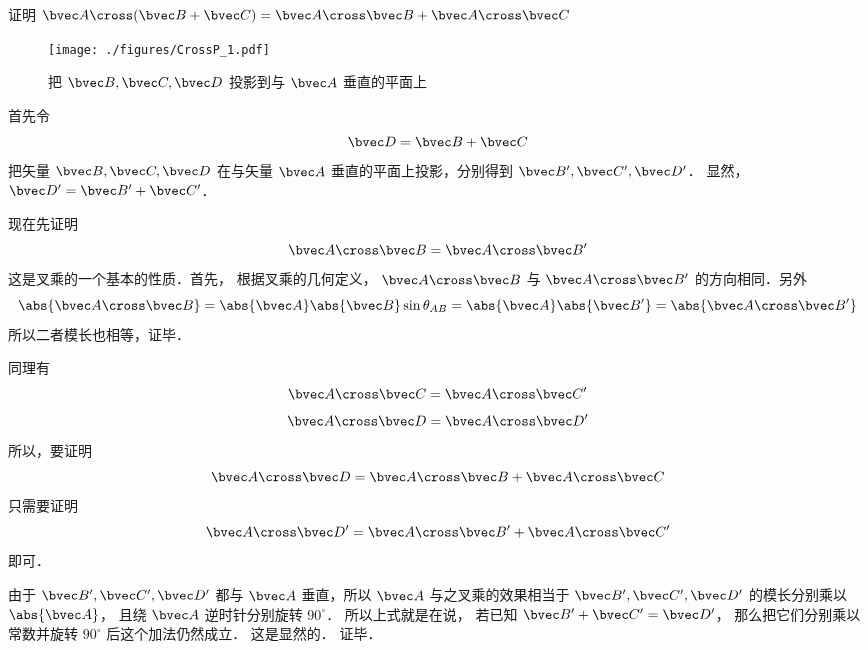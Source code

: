 
证明 $\bvec A \cross (\bvec B + \bvec C) = \bvec A \cross \bvec B + \bvec A \cross \bvec C$ 

\begin{figure}[ht]
\vskip-10pt
\centering
\texttt{[image: ./figures/CrossP\_1.pdf]}
\caption{把 $\bvec B,\bvec C,\bvec D$ 投影到与 $\bvec A$ 垂直的平面上}
\end{figure}

首先令
\begin{equation}
\bvec D = \bvec B + \bvec C
\end{equation}
把矢量 $\bvec B,\bvec C,\bvec D$ 在与矢量 $\bvec A$ 垂直的平面上投影，分别得到 $\bvec B',\bvec C',\bvec D'$． 显然，$\bvec D'=\bvec B'+\bvec C'$． 

现在先证明
\begin{equation}
\bvec A \cross \bvec B = \bvec A \cross \bvec B'
\end{equation} 
这是叉乘的一个基本的性质．首先，
根据叉乘的几何定义， $\bvec A \cross \bvec B$ 与
 $\bvec A \cross \bvec B'$ 的方向相同．另外
\begin{equation}\label{CrossP_eq1}
\abs{\bvec A \cross \bvec B}  = \abs{\bvec A} \abs{\bvec B} \sin{\theta_{AB}} = \abs{\bvec A} \abs{\bvec B'}=\abs{\bvec A \cross \bvec B'}
\end{equation}
所以二者模长也相等，证毕．

同理有 
\begin{equation}
\bvec A \cross \bvec C = \bvec A \cross \bvec C'
\end{equation}
\begin{equation}
\bvec A \cross \bvec D = \bvec A \cross \bvec D'
\end{equation}
所以，要证明
\begin{equation}
\bvec A \cross \bvec D = \bvec A \cross \bvec B + \bvec A \cross \bvec C
\end{equation}
只需要证明
\begin{equation}
\bvec A \cross \bvec D' = \bvec A \cross \bvec B' + \bvec A \cross \bvec C'
\end{equation}
即可．

由于 $\bvec B', \bvec C', \bvec D'$ 都与 $\bvec A$ 垂直，所以 $\bvec A$ 与之叉乘的效果相当于 $\bvec B', \bvec C', \bvec D'$ 的模长分别乘以 $\abs {\bvec A}$， 且绕 $\bvec A$ 逆时针分别旋转 $90^\circ$． 所以上式就是在说， 若已知 $\bvec B' + \bvec C' = \bvec D'$， 那么把它们分别乘以常数并旋转 $90^\circ$ 后这个加法仍然成立． 这是显然的． 证毕．
